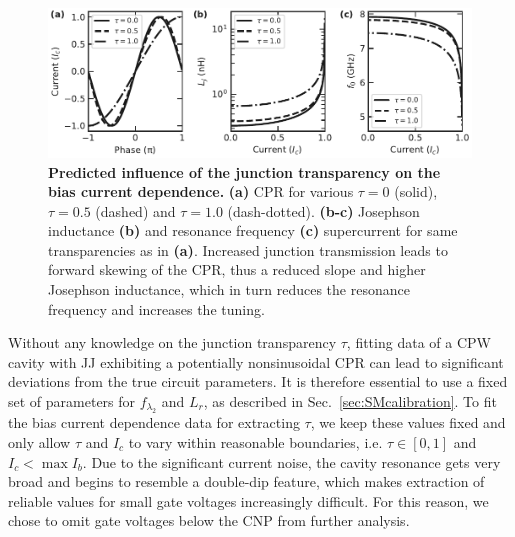 \begin{figure}
	\centering
	\includegraphics[width=\linewidth]{chapter-gJJ-CPR/figs/SMFigure-influence}
	\caption{
		\textbf{Predicted influence of the junction transparency on the bias current dependence.}
		\textbf{(a)} CPR for various $\tau=0$ (solid), $\tau=0.5$ (dashed) and $\tau=1.0$	(dash-dotted).
		\textbf{(b-c)} Josephson inductance \textbf{(b)} and resonance frequency \textbf{(c)} supercurrent for	same transparencies as in \textbf{(a)}.
		Increased junction transmission leads to forward skewing of the CPR, thus a reduced slope and higher Josephson inductance, which in turn reduces the resonance frequency and increases the tuning.
	}
	\label{fig:SMinfluence}
\end{figure}

Without any knowledge on the junction transparency $\tau$, fitting data of a CPW cavity with JJ exhibiting a potentially nonsinusoidal CPR can lead to significant deviations from the true circuit parameters.
%
It is therefore essential to use a fixed set of parameters for $f_{\lambda_2}$ and $L_r$, as described in Sec.~\ref{sec:SMcalibration}.
%
To fit the bias current dependence data for extracting $\tau$, we keep these values fixed and only allow $\tau$ and $I_c$ to vary within reasonable boundaries, i.e. $\tau\in[0,1]$ and $I_c<\max I_b$.
%
Due to the significant current noise, the cavity resonance gets very broad and begins to resemble a double-dip feature, which makes extraction of reliable values for small gate voltages increasingly difficult.
%
For this reason, we chose to omit gate voltages below the CNP from further analysis.




